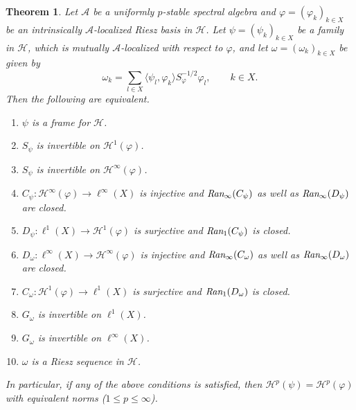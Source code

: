 \documentclass{amsart}
\newtheorem{theorem}{Theorem}
\def\Hil{\mathcal{H}}
\newcommand{\A}[0]{{\mathcal{A}}}
\renewcommand{\H}{{\mathcal{H}}}
\begin{document}
\begin{theorem}\label{thm:main}
Let $\A$ be a uniformly $p$-stable spectral algebra and $\varphi = (\varphi_k)_{k\in X}$ be an intrinsically $\A$-localized Riesz basis in $\Hil$. Let $\psi = (\psi_k)_{k\in X}$ be a family in $\Hil$, which is mutually $\A$-localized with respect to $\varphi$, and let $\omega = (\omega_k)_{k\in X}$ be given by 
$$\omega_k = \sum_{l\in X}\langle \psi_l , \varphi_k \rangle S_{\varphi}^{- {1}/{2}}\varphi_l, \qquad k\in X.$$
Then the following are equivalent.
\begin{enumerate}[label=(\arabic*)]
    \item\label{list:1} $\psi$ is a frame for $\Hil$.
    \item\label{list:2} $S_{\psi}$ is invertible on $\Hil^1(\varphi)$.
    \item\label{list:3} $S_{\psi}$ is invertible on $\Hil^{\infty}(\varphi)$.
          \item\label{list:4}  $C_{\psi}:\Hil^{\infty}(\varphi) \rightarrow \ell^{\infty}(X)$ is injective and  $\emph{Ran}_\infty(C_{\psi})$ as well as $\emph{Ran}_\infty(D_\psi)$ are closed.
       \item\label{list:5}  $D_{\psi}:\ell^1(X) \rightarrow \Hil^1(\varphi)$ is surjective and $\emph{Ran}_1(C_\psi)$ is closed.
         \item\label{list:6}  $D_{\omega}:\ell^{\infty}(X) \rightarrow \Hil^{\infty}(\varphi)$ is injective and $\emph{Ran}_\infty(C_\omega)$ as well as $\emph{Ran}_\infty(D_\omega)$ are closed.
      \item\label{list:7}  $C_{\omega}:\Hil^1(\varphi) \rightarrow \ell^1(X)$ is surjective and $\emph{Ran}_1(D_\omega)$ is closed.
    \item\label{list:8}  $G_{\omega}$ is invertible on $\ell^1(X)$. 
    \item\label{list:9}  $G_{\omega}$ is invertible on $\ell^{\infty}(X)$.
    \item\label{list:10}  $\omega$ is a Riesz sequence in $\H$.
\end{enumerate}
In particular, if any of the above conditions is satisfied, then $\Hil^p(\psi) = \Hil^p(\varphi)$ with equivalent norms ($1\leq p \leq \infty$).

\end{theorem}
\end{document}
